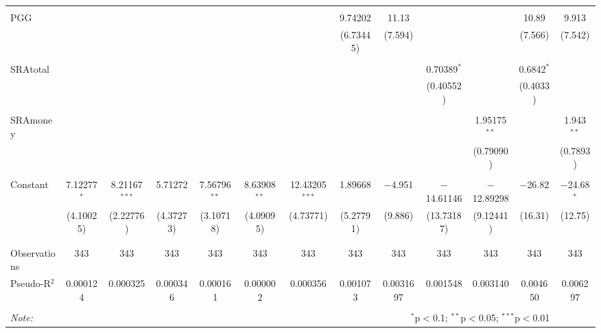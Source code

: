 \documentclass[12pt]{article}
\begin{document}
\begin{table}[!htbp]
\begin{adjustbox}{width=\textwidth}
\begin{tabular}{@{\extracolsep{5pt}}lcccccccccccc}
  & & & & & & & & & & & &\\ 
 PGG &  &  &  &  &  & & 9.74202  & 11.13 &  &  & 10.89 & 9.913 \\ 
  &  &  &  &  &  & & (6.73445)  & (7.594) &  &  & (7.566) & (7.542) \\ 
  & & & & & & & & & & & &\\ 
 SRAtotal &  &  &  &  &  &  & & & 0.70389$^{*}$ &  & 0.6842$^{*}$ &  \\ 
  &  &  &  &  &  &  & & & (0.40552) &  & (0.4033) &  \\ 
  & & & & & & & & & & & \\ 
 SRAmoney &  &  &  &  &  &  &  & & & 1.95175$^{**}$ &  & 1.943$^{**}$ \\ 
  &  &  &  &  &  &  &  & & & (0.79090) &  & (0.7893) \\ 
  & & & & & & & & & & & &\\ 
 Constant & 7.12277$^{*}$ & 8.21167$^{***}$ & 5.71272 & 7.56796$^{**}$ & 8.63908$^{**}$ & 12.43205$^{***}$ & 1.89668 & $-$4.951 & $-$14.61146 & $-$12.89298 & $-$26.82 & $-$24.68$^{*}$ \\ 
  & (4.10025) & (2.22776) & (4.37273) & (3.10718) & (4.09095) & (4.73771) & (5.27791) & (9.886) & (13.73187) & (9.12441) & (16.31) & (12.75) \\ 
  & & & & & & & & & & & \\ 
\hline \\[-1.8ex] 
Observations & 343 & 343 & 343 & 343 & 343 & 343 & 343 & 343 & 343 & 343 & 343 & 343 \\ 
Pseudo-R$^{2}$ & 0.000124 & 0.000325 & 0.000346 & 0.000161 & 0.000002 & 0.000356 & 0.001073 & 0.0031697 & 0.001548 & 0.003140 & 0.004650 & 0.006297\\
\hline 
\hline \\[-1.8ex] 
\textit{Note:}  & \multicolumn{11}{r}{$^{*}$p$<$0.1; $^{**}$p$<$0.05; $^{***}$p$<$0.01} \\ 
\end{tabular} 
\end{adjustbox}
\end{table} 



\newpage
\end{document}
